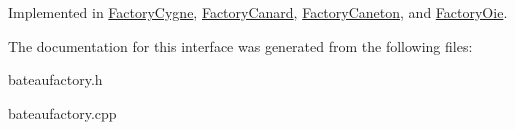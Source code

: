 Implemented in \hyperlink{classFactoryCygne_aa49b4a3704bcb68c0e31cebc3f5767b8}{Factory\+Cygne}, \hyperlink{classFactoryCanard_a3ef0d9a9c293006fb09fd03a911a1377}{Factory\+Canard}, \hyperlink{classFactoryCaneton_ac03710919dab69d816bb4c8fd047f4eb}{Factory\+Caneton}, and \hyperlink{classFactoryOie_aef35f008954feedb26821fdf5b73328f}{Factory\+Oie}.



The documentation for this interface was generated from the following files\+:\begin{DoxyCompactItemize}
\item 
bateaufactory.\+h\item 
bateaufactory.\+cpp\end{DoxyCompactItemize}
